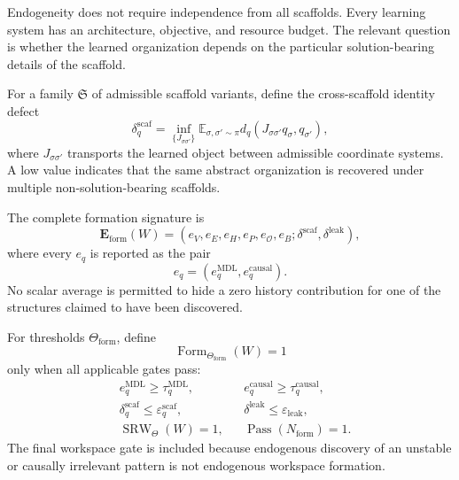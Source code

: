 
Endogeneity does not require independence from all scaffolds. Every learning
system has an architecture, objective, and resource budget. The relevant
question is whether the learned organization depends on the particular
solution-bearing details of the scaffold.

For a family \(\mathfrak S\) of admissible scaffold variants, define the
cross-scaffold identity defect
\[
\boxed{
\delta_q^{\mathrm{scaf}}
=
\inf_{\{J_{\sigma\sigma'}\}}
\mathbb E_{\sigma,\sigma'\sim\pi}
 d_q
\left(
J_{\sigma\sigma'}q_{\sigma},q_{\sigma'}
\right),
}
\]
where \(J_{\sigma\sigma'}\) transports the learned object between admissible
coordinate systems. A low value indicates that the same abstract
organization is recovered under multiple non-solution-bearing scaffolds.

The complete formation signature is
\[
\boxed{
\mathbf E_{\mathrm{form}}(W)
=
\left(
 e_V,e_E,e_H,e_P,e_{\mathcal O},e_B;
 \delta^{\mathrm{scaf}},
 \delta^{\mathrm{leak}}
\right),
}
\]
where every \(e_q\) is reported as the pair
\[
 e_q
=
\left(
 e_q^{\mathrm{MDL}},
 e_q^{\mathrm{causal}}
\right).
\]
No scalar average is permitted to hide a zero history contribution for one of
the structures claimed to have been discovered.


For thresholds \(\Theta_{\mathrm{form}}\), define
\[
\operatorname{Form}_{\Theta_{\mathrm{form}}}(W)=1
\]
only when all applicable gates pass:
\[
\begin{aligned}
& e_q^{\mathrm{MDL}}\geq \tau_q^{\mathrm{MDL}},
&& e_q^{\mathrm{causal}}\geq \tau_q^{\mathrm{causal}},\\
& \delta_q^{\mathrm{scaf}}\leq\varepsilon_q^{\mathrm{scaf}},
&& \delta^{\mathrm{leak}}\leq\varepsilon_{\mathrm{leak}},\\
& \operatorname{SRW}_{\Theta}(W)=1,
&& \operatorname{Pass}(N_{\mathrm{form}})=1.
\end{aligned}
\]
The final workspace gate is included because endogenous discovery of an
unstable or causally irrelevant pattern is not endogenous workspace formation.




